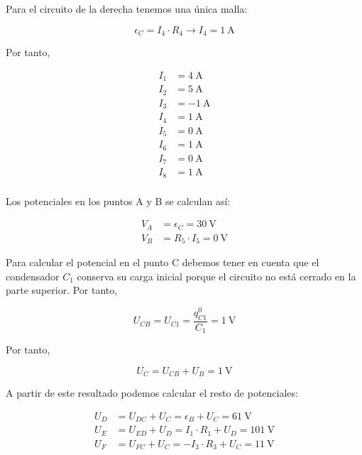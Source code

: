\documentclass[10pt]{article}
\begin{document}
Para el circuito de la derecha tenemos una única malla:

\begin{equation*}
  \epsilon_C = I_4 \cdot R_4 \rightarrow I_4 = \SI{1}{\ampere}
\end{equation*}

Por tanto,

\begin{align*}
  I_1 &= \SI{4}{\ampere}\\
  I_2 &= \SI{5}{\ampere}\\
  I_3 &= \SI{-1}{\ampere}\\
  I_4 &= \SI{1}{\ampere}\\
  I_5 &= \SI{0}{\ampere}\\
  I_6 &= \SI{1}{\ampere}\\
  I_7 &= \SI{0}{\ampere}\\
  I_8 &= \SI{1}{\ampere}\\
\end{align*}

Los potenciales en los puntos A y B se calculan así:

\begin{align*}
  V_A &= \epsilon_C = \SI{30}{\volt}\\
  V_B &= R_5 \cdot I_5 = \SI{0}{\volt}
\end{align*}

Para calcular el potencial en el punto C debemos tener en cuenta que el condensador $C_1$ conserva su carga inicial porque el circuito no está cerrado en la parte superior. Por tanto,

\begin{equation*}
  U_{CB} = U_{C1} = \frac{q^0_{C1} }{C_1} = \SI{1}{\volt}
\end{equation*}

Por tanto,

\begin{equation*}
  U_C = U_{CB} + U_B = \SI{1}{\volt}
\end{equation*}

A partir de este resultado podemos calcular el resto de potenciales:

\begin{align*}
  U_D &= U_{DC} + U_C = \epsilon_B + U_C = \SI{61}{\volt}\\
  U_E &= U_{ED} + U_D = I_1 \cdot R_1 + U_D = \SI{101}{\volt}\\
  U_F &= U_{FC} + U_C = -I_3 \cdot R_3 + U_C = \SI{11}{\volt}
\end{align*}
\end{document}
